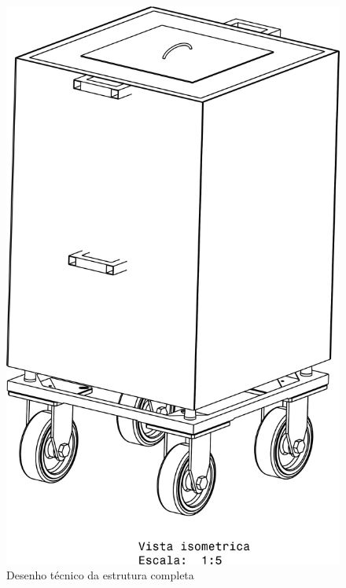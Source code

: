 \begin{figure}[H]
	\centering
	\includegraphics[scale=.5]{figuras/desenho_completo.png}
	\caption{Desenho técnico da estrutura completa}
\end{figure}


